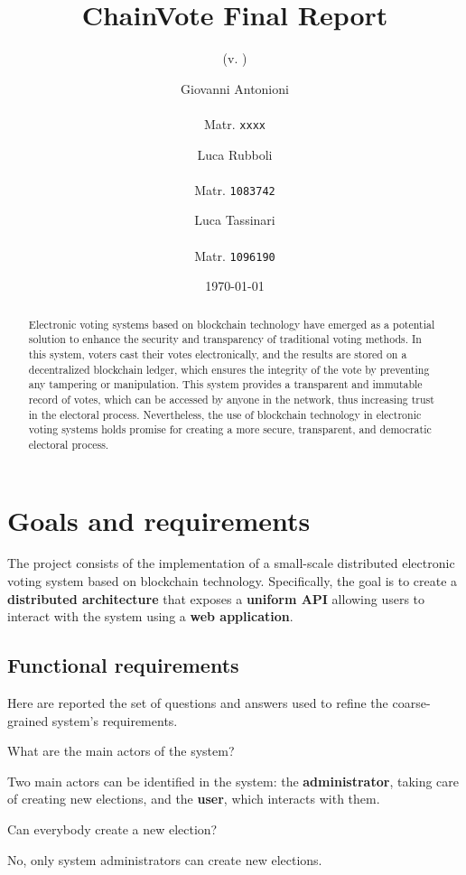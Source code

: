 \documentclass{scrartcl}
\title{\LARGE
    ChainVote Final Report
}
\subtitle{(v. \version)}
\author{
    Giovanni Antonioni \\ \emailaddr{giovanni.antonioni2@studio.unibo.it} \\ Matr. \texttt{xxxx}
    \and 
    Luca Rubboli \\ \emailaddr{luca.rubboli2@studio.unibo.it} \\ Matr. \texttt{1083742}
    \and
    Luca Tassinari \\ \emailaddr{luca.tassinari10@studio.unibo.it} \\ Matr. \texttt{1096190}
}
\date{\today}
\begin{document}
\maketitle

\begin{abstract}
    Electronic voting systems based on blockchain technology have emerged as a potential solution to enhance the security and transparency of traditional voting methods. In this system, voters cast their votes electronically, and the results are stored on a decentralized blockchain ledger, which ensures the integrity of the vote by preventing any tampering or manipulation. This system provides a transparent and immutable record of votes, which can be accessed by anyone in the network, thus increasing trust in the electoral process. Nevertheless, the use of blockchain technology in electronic voting systems holds promise for creating a more secure, transparent, and democratic electoral process.
\end{abstract}

\section{Goals and requirements}

The project consists of the implementation of a small-scale distributed electronic voting system based on blockchain technology.
%
Specifically, the goal is to create a \textbf{distributed architecture} that exposes a \textbf{uniform API} allowing users to interact with the system using a \textbf{web application}.

\subsection{Functional requirements}

Here are reported the set of questions and answers used to refine the coarse-grained system's requirements.

\begin{Question}
    What are the main actors of the system?
\end{Question}
\begin{Answer}
    Two main actors can be identified in the system: the \textbf{administrator}, taking care of creating new elections, and the \textbf{user}, which interacts with them.
\end{Answer}

\begin{Question}
    Can everybody create a new election?
\end{Question}
\begin{Answer}
    No, only system administrators can create new elections.
\end{Answer}
\end{document}

